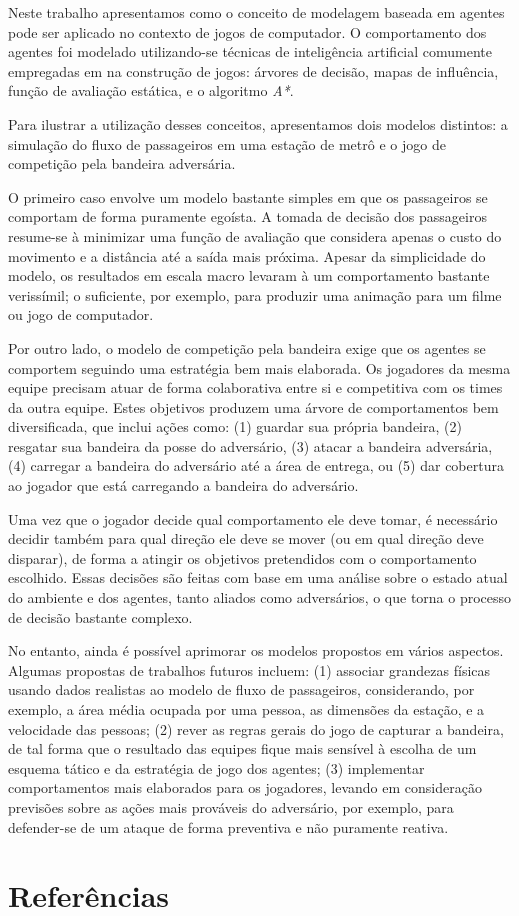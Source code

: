 \documentclass[preprint,12pt]{elsarticle}
\begin{document}
Neste trabalho apresentamos como o conceito de modelagem baseada em agentes pode ser aplicado no contexto de jogos de computador. O comportamento dos agentes foi modelado utilizando-se técnicas de inteligência artificial comumente empregadas em na construção de jogos: árvores de decisão, mapas de influência, função de avaliação estática, e o algoritmo \textit{A*}.

Para ilustrar a utilização desses conceitos, apresentamos dois modelos distintos: a simulação do fluxo de passageiros em uma estação de metrô e o jogo de competição pela bandeira adversária. 

O primeiro caso envolve um modelo bastante simples em que os passageiros se comportam de forma puramente egoísta. A tomada de decisão dos passageiros resume-se à minimizar uma função de avaliação que considera apenas o custo do movimento e a distância até a saída mais próxima. Apesar da simplicidade do modelo, os resultados em escala macro levaram à um comportamento bastante verissímil; o suficiente, por exemplo, para produzir uma animação para um filme ou jogo de computador.

Por outro lado, o modelo de competição pela bandeira exige que os agentes se comportem seguindo uma estratégia bem mais elaborada. Os jogadores da mesma equipe precisam atuar de forma colaborativa entre si e competitiva com os times da outra equipe. Estes objetivos produzem uma árvore de comportamentos bem diversificada, que inclui ações como: (1) guardar sua própria bandeira, (2) resgatar sua bandeira da posse do adversário, (3) atacar a bandeira adversária, (4) carregar a bandeira do adversário até a área de entrega, ou (5) dar cobertura ao jogador que está carregando a bandeira do adversário. 

Uma vez que o jogador decide qual comportamento ele deve tomar, é necessário decidir também para qual direção ele deve se mover (ou em qual direção deve disparar), de forma a atingir os objetivos pretendidos com o comportamento escolhido. Essas decisões são feitas com base em uma análise sobre o estado atual do ambiente e dos agentes, tanto aliados como adversários, o que torna o processo de decisão bastante complexo.

No entanto, ainda é possível aprimorar os modelos propostos em vários aspectos. Algumas propostas de trabalhos futuros incluem: (1) associar grandezas físicas usando dados realistas ao modelo de fluxo de passageiros, considerando, por exemplo, a área média ocupada por uma pessoa, as dimensões da estação, e a velocidade das pessoas; (2) rever as regras gerais do jogo de capturar a bandeira, de tal forma que o resultado das equipes fique mais sensível à escolha de um esquema tático e da estratégia de jogo dos agentes; (3) implementar comportamentos mais elaborados para os jogadores, levando em consideração previsões sobre as ações mais prováveis do adversário, por exemplo, para defender-se de um ataque de forma preventiva e não puramente reativa.

\section*{Referências}



\end{document}
